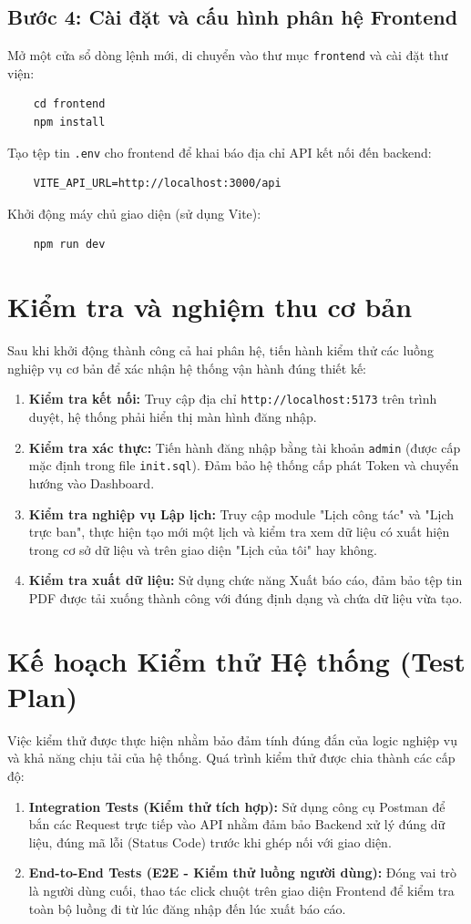 \documentclass[18pt,a4paper]{report}
\begin{document}
\subsection{Bước 4: Cài đặt và cấu hình phân hệ Frontend}
Mở một cửa sổ dòng lệnh mới, di chuyển vào thư mục \texttt{frontend} và cài đặt thư viện:
\begin{verbatim}
    cd frontend
    npm install
\end{verbatim}
Tạo tệp tin \texttt{.env} cho frontend để khai báo địa chỉ API kết nối đến backend:
\begin{verbatim}
    VITE_API_URL=http://localhost:3000/api
\end{verbatim}
Khởi động máy chủ giao diện (sử dụng Vite):
\begin{verbatim}
    npm run dev
\end{verbatim}

\section{Kiểm tra và nghiệm thu cơ bản}
Sau khi khởi động thành công cả hai phân hệ, tiến hành kiểm thử các luồng nghiệp vụ cơ bản để xác nhận hệ thống vận hành đúng thiết kế:
\begin{enumerate}[leftmargin=1.2cm]
    \item \textbf{Kiểm tra kết nối:} Truy cập địa chỉ \texttt{http://localhost:5173} trên trình duyệt, hệ thống phải hiển thị màn hình đăng nhập.
    \item \textbf{Kiểm tra xác thực:} Tiến hành đăng nhập bằng tài khoản \texttt{admin} (được cấp mặc định trong file \texttt{init.sql}). Đảm bảo hệ thống cấp phát Token và chuyển hướng vào Dashboard.
    \item \textbf{Kiểm tra nghiệp vụ Lập lịch:} Truy cập module "Lịch công tác" và "Lịch trực ban", thực hiện tạo mới một lịch và kiểm tra xem dữ liệu có xuất hiện trong cơ sở dữ liệu và trên giao diện "Lịch của tôi" hay không.
    \item \textbf{Kiểm tra xuất dữ liệu:} Sử dụng chức năng Xuất báo cáo, đảm bảo tệp tin PDF được tải xuống thành công với đúng định dạng và chứa dữ liệu vừa tạo.
\end{enumerate}

\section{Kế hoạch Kiểm thử Hệ thống (Test Plan)}
Việc kiểm thử được thực hiện nhằm bảo đảm tính đúng đắn của logic nghiệp vụ và khả năng chịu tải của hệ thống. Quá trình kiểm thử được chia thành các cấp độ:
\begin{enumerate}[leftmargin=1.2cm]
    \item \textbf{Integration Tests (Kiểm thử tích hợp):} Sử dụng công cụ Postman để bắn các Request trực tiếp vào API nhằm đảm bảo Backend xử lý đúng dữ liệu, đúng mã lỗi (Status Code) trước khi ghép nối với giao diện.
    \item \textbf{End-to-End Tests (E2E - Kiểm thử luồng người dùng):} Đóng vai trò là người dùng cuối, thao tác click chuột trên giao diện Frontend để kiểm tra toàn bộ luồng đi từ lúc đăng nhập đến lúc xuất báo cáo.
\end{enumerate}
\end{document}
